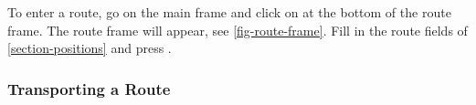 \documentclass{ol-softwaremanual}
\begin{document}
To enter a route, go on the main frame and click on  at the bottom of the route frame. The route frame will appear, see \cref{fig-route-frame}. Fill in the route fields of \cref{section-positions} and press . 

\subsubsection{Transporting a Route}\label{section-transporting-route}


\pagebreak
\printacronyms[pages={display=all,seq/use=false}]


\end{document}
